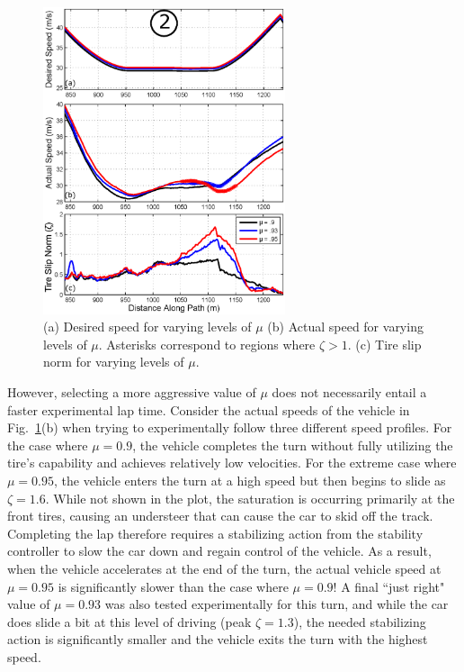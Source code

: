 \documentclass[9pt,shortpaper,twoside,web]{ieeecolor}
\begin{document}
{{{\begin{figure}
\centering
\includegraphics[width=2.8in]{figures/t2res.eps}
\caption[Desired speed for varying levels of $\mu$ - region 2]{(a) Desired speed for varying levels of $\mu$ (b) Actual speed for varying levels of $\mu$. Asterisks correspond to 
regions where $\zeta > 1$. (c) Tire slip norm for varying levels of $\mu$. }
\label{fig:t2}
\end{figure}

However, selecting a more aggressive value of $\mu$ does not necessarily entail a faster experimental lap time. Consider the actual speeds of the vehicle in
Fig.~\ref{fig:t2}(b) when trying to experimentally follow three different speed profiles. For the case where $\mu = 0.9$, the vehicle completes
the turn without fully utilizing the tire's capability and achieves relatively low velocities. For the extreme case where $\mu = 0.95$, the
vehicle enters the turn at a high speed but then begins to slide as $\zeta = 1.6$. While not shown in the plot, the saturation
is occurring primarily at the front tires, causing an understeer that can cause the car to skid off the track. Completing the lap therefore requires a stabilizing
action from the stability controller to slow the car down and regain control of the vehicle. As a result,
when the vehicle accelerates at the end of the turn, the actual vehicle speed at $\mu = 0.95$ is significantly slower than the case where $\mu = 0.9$!
A final ``just right" value of $\mu = 0.93$ was also tested experimentally for this turn, and while the car does slide a bit at this level of driving (peak $\zeta = 1.3$),
the needed stabilizing action is significantly smaller and the vehicle exits the turn with the highest speed. 

}}}
\end{document}

